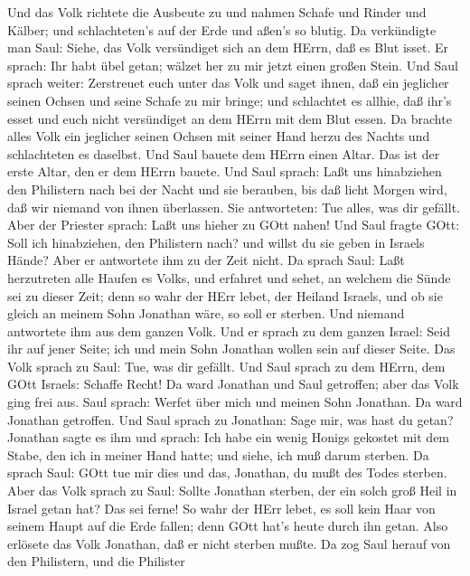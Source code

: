  Und das Volk richtete die Ausbeute zu und nahmen Schafe
und Rinder und Kälber; und schlachteten's auf der Erde und aßen's so
blutig.  Da verkündigte man Saul: Siehe, das Volk
versündiget sich an dem HErrn, daß es Blut isset. Er sprach: Ihr habt
übel getan; wälzet her zu mir jetzt einen großen Stein. 
Und Saul sprach weiter: Zerstreuet euch unter das Volk und saget ihnen,
daß ein jeglicher seinen Ochsen und seine Schafe zu mir bringe; und
schlachtet es allhie, daß ihr's esset und euch nicht versündiget an dem
HErrn mit dem Blut essen. Da brachte alles Volk ein jeglicher seinen
Ochsen mit seiner Hand herzu des Nachts und schlachteten es daselbst.
 Und Saul bauete dem HErrn einen Altar. Das ist der erste
Altar, den er dem HErrn bauete.  Und Saul sprach: Laßt uns
hinabziehen den Philistern nach bei der Nacht und sie berauben, bis daß
licht Morgen wird, daß wir niemand von ihnen überlassen. Sie
antworteten: Tue alles, was dir gefällt. Aber der Priester sprach: Laßt
uns hieher zu GOtt nahen!  Und Saul fragte GOtt: Soll ich
hinabziehen, den Philistern nach? und willst du sie geben in Israels
Hände? Aber er antwortete ihm zu der Zeit nicht.  Da sprach
Saul: Laßt herzutreten alle Haufen es Volks, und erfahret und sehet, an
welchem die Sünde sei zu dieser Zeit;  denn so wahr der
HErr lebet, der Heiland Israels, und ob sie gleich an meinem Sohn
Jonathan wäre, so soll er sterben. Und niemand antwortete ihm aus dem
ganzen Volk.  Und er sprach zu dem ganzen Israel: Seid ihr
auf jener Seite; ich und mein Sohn Jonathan wollen sein auf dieser
Seite. Das Volk sprach zu Saul: Tue, was dir gefällt.  Und
Saul sprach zu dem HErrn, dem GOtt Israels: Schaffe Recht! Da ward
Jonathan und Saul getroffen; aber das Volk ging frei aus. 
Saul sprach: Werfet über mich und meinen Sohn Jonathan. Da ward Jonathan
getroffen.  Und Saul sprach zu Jonathan: Sage mir, was hast
du getan? Jonathan sagte es ihm und sprach: Ich habe ein wenig Honigs
gekostet mit dem Stabe, den ich in meiner Hand hatte; und siehe, ich muß
darum sterben.  Da sprach Saul: GOtt tue mir dies und das,
Jonathan, du mußt des Todes sterben.  Aber das Volk sprach
zu Saul: Sollte Jonathan sterben, der ein solch groß Heil in Israel
getan hat? Das sei ferne! So wahr der HErr lebet, es soll kein Haar von
seinem Haupt auf die Erde fallen; denn GOtt hat's heute durch ihn getan.
Also erlösete das Volk Jonathan, daß er nicht sterben mußte.
 Da zog Saul herauf von den Philistern, und die Philister
